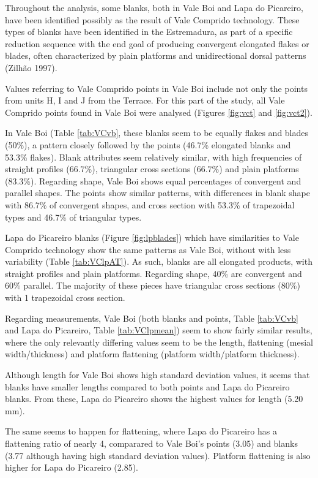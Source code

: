 \documentclass[12pt,twoside]{reedthesis}
\begin{document}
Throughout the analysis, some blanks, both in Vale Boi and Lapa do Picareiro, have been identified possibly as the result of Vale Comprido technology. These types of blanks have been identified in the Estremadura, as part of a specific reduction sequence with the end goal of producing convergent elongated flakes or blades, often characterized by plain platforms and unidirectional dorsal patterns (Zilhão 1997).

Values referring to Vale Comprido points in Vale Boi include not only the points from units H, I and J from the Terrace. For this part of the study, all Vale Comprido points found in Vale Boi were analysed (Figures \ref{fig:vct} and \ref{fig:vct2}).

In Vale Boi (Table \ref{tab:VCvb}, these blanks seem to be equally flakes and blades (50\%), a pattern closely followed by the points (46.7\% elongated blanks and 53.3\% flakes). Blank attributes seem relatively similar, with high frequencies of straight profiles (66.7\%), triangular cross sections (66.7\%) and plain platforms (83.3\%). Regarding shape, Vale Boi shows equal percentages of convergent and parallel shapes. The points show similar patterns, with differences in blank shape with 86.7\% of convergent shapes, and cross section with 53.3\% of trapezoidal types and 46.7\% of triangular types.

Lapa do Picareiro blanks (Figure \ref{fig:lpblades}) which have similarities to Vale Comprido technology show the same patterns as Vale Boi, without with less variability (Table \ref{tab:VClpAT}). As such, blanks are all elongated products, with straight profiles and plain platforms. Regarding shape, 40\% are convergent and 60\% parallel. The majority of these pieces have triangular cross sections (80\%) with 1 trapezoidal cross section.

Regarding measurements, Vale Boi (both blanks and points, Table \ref{tab:VCvb} and Lapa do Picareiro, Table \ref{tab:VClpmean}) seem to show fairly similar results, where the only relevantly differing values seem to be the length, flattening (mesial width/thickness) and platform flattening (platform width/platform thickness).

Although length for Vale Boi shows high standard deviation values, it seems that blanks have smaller lengths compared to both points and Lapa do Picareiro blanks. From these, Lapa do Picareiro shows the highest values for length (5.20 mm).

The same seems to happen for flattening, where Lapa do Picareiro has a flattening ratio of nearly 4, comparared to Vale Boi's points (3.05) and blanks (3.77 although having high standard deviation values). Platform flattening is also higher for Lapa do Picareiro (2.85).
\end{document}
